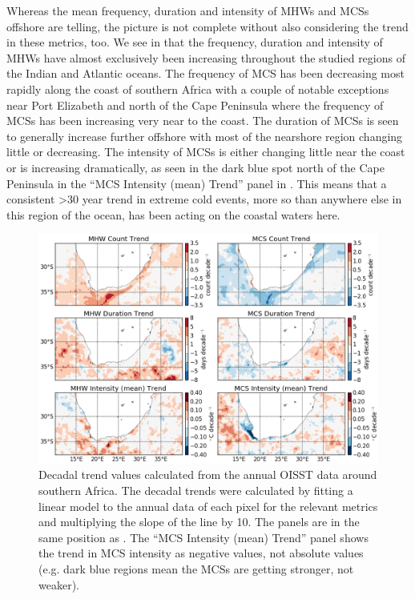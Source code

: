 \documentclass[a4paper,10pt,review]{elsarticle}
\begin{document}
Whereas the mean frequency, duration and intensity of MHWs and MCSs offshore are telling, the picture is not complete without also considering the trend in these metrics, too. We see in  that the frequency, duration and intensity of MHWs have almost exclusively been increasing throughout the studied regions of the Indian and Atlantic oceans. The frequency of MCS has been decreasing most rapidly along the coast of southern Africa with a couple of notable exceptions near Port Elizabeth and north of the Cape Peninsula where the frequency of MCSs has been increasing very near to the coast. The duration of MCSs is seen to generally increase further offshore with most of the nearshore region changing little or decreasing. The intensity of MCSs is either changing little near the coast or is increasing dramatically, as seen in the dark blue spot north of the Cape Peninsula in the ``MCS Intensity (mean) Trend'' panel in . This means that a consistent >30 year trend in extreme cold events, more so than anywhere else in this region of the ocean, has been acting on the coastal waters here.

\begin{figure}
\centering \includegraphics[width=1.0\textwidth]{MHW_MCS_trend.png}
\caption{Decadal trend values calculated from the annual OISST data around southern Africa. The decadal trends were calculated by fitting a linear model to the annual data of each pixel for the relevant metrics and multiplying the slope of the line by 10. The panels are in the same position as . The ``MCS Intensity (mean) Trend'' panel shows the trend in MCS intensity as negative values, not absolute values (e.g. dark blue regions mean the MCSs are getting stronger, not weaker).}
\label{fig:Figure7}
\end{figure}
\end{document}
